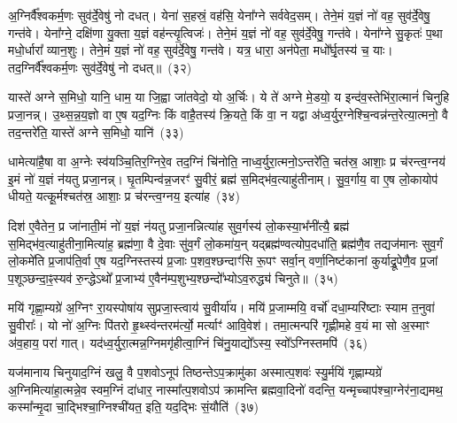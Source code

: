 अ॒ग्निर्वै᳚श्वकर्म॒णः सुव॑र्दे॒वेषु॑ नो दधत्। येना॑ स॒हस्रं॒ वह॑सि॒ येना᳚ग्ने सर्ववेद॒सम्। तेने॒मं य॒ज्ञं नो॑ वह॒ सुव॑र्दे॒वेषु॒ गन्त॑वे। येना᳚ग्ने॒ दक्षि॑णा यु॒क्ता य॒ज्ञं वह॑न्त्यृ॒त्विजः॑। तेने॒मं य॒ज्ञं नो॑ वह॒ सुव॑र्दे॒वेषु॒ गन्त॑वे। येना᳚ग्ने सु॒कृतः॑ प॒था मधो॒र्धारा᳚ व्यान॒शुः। तेने॒मं य॒ज्ञं नो॑ वह॒ सुव॑र्दे॒वेषु॒ गन्त॑वे। यत्र॒ धारा॒ अन॑पेता॒ मधो᳚र्घृ॒तस्य॑ च॒ याः। तद॒ग्निर्वै᳚श्वकर्म॒णः सुव॑र्दे॒वेषु॑ नो दधत्॥~(३२)

{\anuvakamend[{आ॒गच्छा॒त्तद्व्या॑न॒शुस्तेने॒मं य॒ज्ञं नो॑ वह॒ सुव॑र्दे॒वेषु॒ गन्त॑वे॒ चतु॑र्दश च}]}%

यास्ते॑ अग्ने स॒मिधो॒ यानि॒ धाम॒ या जि॒ह्वा जा॑तवेदो॒ यो अ॒र्चिः। ये ते॑ अग्ने मे॒डयो॒ य इन्द॑व॒स्तेभि॑रा॒त्मानं॑ चिनुहि प्रजा॒नन्न्। उ॒थ्स॒न्न॒य॒ज्ञो वा ए॒ष यद॒ग्निः किं वाहै॒तस्य॑ क्रि॒यते॒ किं वा॒ न यद्वा अ॑ध्व॒र्युर॒ग्नेश्चि॒न्वन्न॑न्त॒रेत्या॒त्मनो॒ वै तद॒न्तरे॑ति॒ यास्ते॑ अग्ने स॒मिधो॒ यानि॑~(३३)

धामेत्या॑है॒षा वा अ॒ग्नेः स्व॑यञ्चि॒तिर॒ग्निरे॒व तद॒ग्निं चि॑नोति॒ नाध्व॒र्युरा॒त्मनो॒\-ऽन्तरे॑ति॒ चत॑स्र॒ आशाः॒ प्र च॑रन्त्व॒ग्नय॑ इ॒मं नो॑ य॒ज्ञं न॑यतु प्रजा॒नन्न्। घृ॒तम्पिन्व॑न्न॒जरꣳ॑ सु॒वीरं॒ ब्रह्म॑ स॒मिद्भ॑व॒त्याहु॑तीनाम्। सु॒व॒र्गाय॒ वा ए॒ष लो॒कायोप॑ धीयते॒ यत्कू॒र्मश्चत॑स्र॒ आशाः॒ प्र च॑रन्त्व॒ग्नय॒ इत्या॑ह~(३४)

दिश॑ ए॒वैतेन॒ प्र जा॑नाती॒मं नो॑ य॒ज्ञं न॑यतु प्रजा॒नन्नित्या॑ह सुव॒र्गस्य॑ लो॒कस्या॒भ᳚नी॑त्यै॒ ब्रह्म॑ स॒मिद्भ॑व॒त्याहु॑तीना॒मित्या॑ह॒ ब्रह्म॑णा॒ वै दे॒वाः सु॑व॒र्गं लो॒कमा॑य॒न् यद्ब्रह्म॑ण्वत्योप॒दधा॑ति॒ ब्रह्म॑णै॒व तद्यज॑मानः सुव॒र्गं लो॒कमे॑ति प्र॒जाप॑ति॒र्वा ए॒ष यद॒ग्निस्तस्य॑ प्र॒जाः प॒शव॒श्छन्दाꣳ॑सि रू॒पꣳ सर्वा॒न् वर्णा॒निष्ट॑कानां कुर्याद्रू॒पेणै॒व प्र॒जां प॒शूञ्छन्दा॒ꣴ॒स्यव॑ रु॒न्द्धे\-ऽथो᳚ प्र॒जाभ्य॑ ए॒वैन॑म्प॒शुभ्य॒श्छन्दो᳚भ्यो\-ऽव॒रुद्ध्य॑ चिनुते॥~(३५)

{\anuvakamend[{यान्य॒ग्नय॒ इत्या॒हेष्ट॑काना॒ꣳ॒ षोड॑श च}]}%

मयि॑ गृह्णा॒म्यग्रे॑ अ॒ग्निꣳ रा॒यस्पोषा॑य सुप्रजा॒स्त्वाय॑ सु॒वीर्या॑य। मयि॑ प्र॒जाम्मयि॒ वर्चो॑ दधा॒म्यरि॑ष्टाः स्याम त॒नुवा॑ सु॒वीराः᳚। यो नो॑ अ॒ग्निः पि॑तरो हृ॒थ्स्व॑न्तरम॑र्त्यो॒ मर्त्याꣳ॑ आवि॒वेश॑। तमा॒त्मन्परि॑ गृह्णीमहे व॒यं मा सो अ॒स्माꣳ अ॑व॒हाय॒ परा॑ गात्। यद॑ध्व॒र्युरा॒त्मन्न॒ग्निमगृ॑हीत्वा॒ग्निं चि॑नु॒याद्यो᳚\-ऽस्य॒ स्वो᳚\-ऽग्निस्तमपि॑~(३६)

यज॑मानाय चिनुयाद॒ग्निं खलु॒ वै प॒शवो\-ऽनूप॑ तिष्ठन्ते\-ऽप॒क्रामु॑का अस्मात्प॒शवः॑ स्यु॒र्मयि॑ गृह्णाम्यग्रे॑ अ॒ग्निमित्या॑हा॒त्मन्ने॒व स्वम॒ग्निं दा॑धार॒ नास्मा᳚त्प॒शवो\-ऽप॑ क्रामन्ति ब्रह्मवा॒दिनो॑ वदन्ति॒ यन्मृच्चाप॑श्चा॒ग्नेर॑ना॒द्यमथ॒ कस्मा᳚न्मृ॒दा चा॒द्भिश्चा॒ग्निश्ची॑यत॒ इति॒ यद॒द्भिः सं॒यौति॑~(३७)


